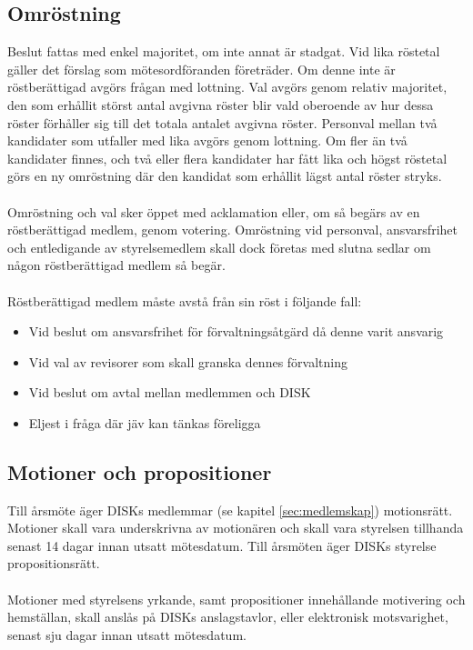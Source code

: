 	\subsection{Omröstning}
	\label{subsec:omrostning}
		Beslut fattas med enkel majoritet, om inte annat är stadgat. Vid lika röstetal gäller det förslag som mötesordföranden företräder. Om denne inte är röstberättigad avgörs frågan med lott\-ning. Val avgörs genom relativ majoritet, den som erhållit störst antal avgivna röster blir vald oberoende av hur dessa röster förhåller sig till det totala antalet avgivna röster. Personval mellan två kandidater som utfaller med lika avgörs genom lottning. Om fler än två kandidater finnes, och två eller flera kandidater har fått lika och högst röstetal görs en ny omröstning där den kandidat som erhållit lägst antal röster stryks.\\ \\
		Omröstning och val sker öppet med acklamation eller, om så begärs av en röstberättigad medlem, genom votering. Omröstning vid personval, ansvarsfrihet och entledigande av styrelse\-medlem skall dock företas med slutna sedlar om någon röstberättigad medlem så begär.\\ \\
Röstberättigad medlem måste avstå från sin röst i följande fall:

		\begin{itemize}
		\setlength{\itemsep}{0.0cm}
		\setlength{\parskip}{0.0cm}
			\item Vid beslut om ansvarsfrihet för förvaltningsåtgärd då denne varit ansvarig
			\item Vid val av revisorer som skall granska dennes förvaltning
			\item Vid beslut om avtal mellan medlemmen och DISK
			\item Eljest i fråga där jäv kan tänkas föreligga
		\end{itemize}

	\subsection{Motioner och propositioner}
	\label{subsec:motionerochpropositioner}
		Till årsmöte äger DISKs medlemmar (se kapitel \ref{sec:medlemskap}) motionsrätt. Motioner skall vara underskrivna av motionären och skall vara styrelsen tillhanda senast 14 dagar innan utsatt mötesdatum.
		Till årsmöten äger DISKs styrelse propositionsrätt.\\ \\
Motioner med styrelsens yrkande, samt propositioner innehållande motivering och hemställan, skall anslås på DISKs anslagstavlor, eller elektronisk motsvarighet, senast sju dagar innan utsatt mötesdatum.

